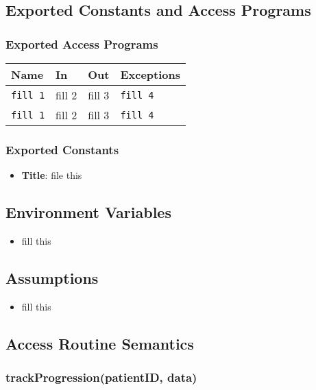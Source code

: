 \documentclass[12pt, titlepage]{article}
\begin{document}
\subsection{Exported Constants and Access Programs}
\subsubsection{Exported Access Programs}
\begin{tabular}{|l|l|l|l|}
    \hline
    \textbf{Name} & \textbf{In} & \textbf{Out} & \textbf{Exceptions} \\
    \hline 
    \texttt{fill 1} & fill 2 & fill 3 & \texttt{fill 4} \\
    \hline
    \texttt{fill 1} & fill 2 & fill 3 & \texttt{fill 4} \\
    \hline
\end{tabular}

\subsubsection{Exported Constants}
\begin{itemize}
\item \textbf{Title}: file this 
\end{itemize}

\subsection{Environment Variables}
\begin{itemize}
    \item fill this
\end{itemize}

\subsection{Assumptions}
\begin{itemize}
    \item fill this
\end{itemize}

\subsection{Access Routine Semantics}
\subsubsection{trackProgression(patientID, data)}
\end{document}
